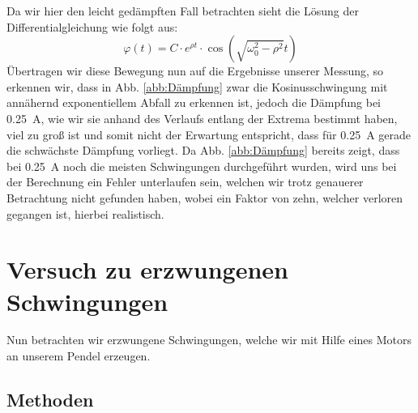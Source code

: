 \documentclass[11pt,a4paper,titlepage, ngerman]{article}
\newcommand{\refabb}[1]{Abb. \ref{abb:#1}}
\begin{document}
			Da wir hier den leicht gedämpften Fall betrachten sieht die Lösung der Differentialgleichung wie folgt aus:
			\begin{equation}
				\varphi (t)=C\cdot e^{\rho t}\cdot \cos{(\sqrt{\omega_0^2-\rho^2}t)}
			\end{equation}
			Übertragen wir diese Bewegung nun auf die Ergebnisse unserer Messung, so erkennen wir, dass in \refabb{Dämpfung} zwar die Kosinusschwingung mit annähernd exponentiellem Abfall zu erkennen ist, jedoch die Dämpfung bei \SI{0.25}{\A}, wie wir sie anhand des Verlaufs entlang der Extrema bestimmt haben, viel zu groß ist und somit nicht der Erwartung entspricht, dass für \SI{0.25}{\A} gerade die schwächste Dämpfung vorliegt. Da \refabb{Dämpfung} bereits zeigt, dass bei \SI{0.25}{\A} noch die meisten Schwingungen durchgeführt wurden, wird uns bei der Berechnung ein Fehler unterlaufen sein, welchen wir trotz genauerer Betrachtung nicht gefunden haben, wobei ein Faktor von zehn, welcher verloren gegangen ist, hierbei realistisch.
			
	\section{Versuch zu erzwungenen Schwingungen}
	
		Nun betrachten wir erzwungene Schwingungen, welche wir mit Hilfe eines Motors an unserem Pendel erzeugen.
			
		\subsection*{Methoden}
			
\end{document}
